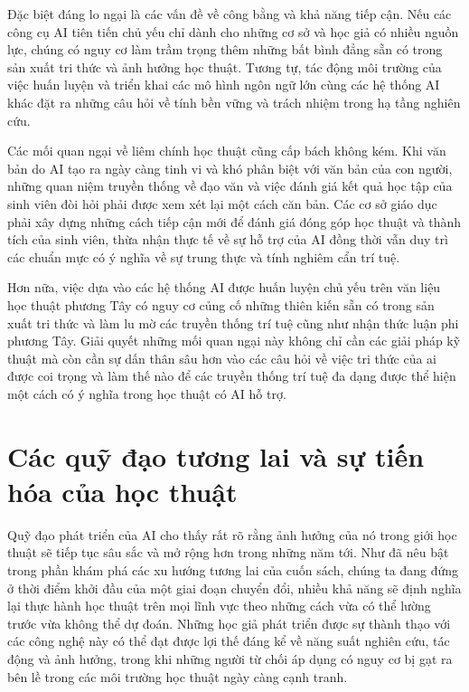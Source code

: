 Đặc biệt đáng lo ngại là các vấn đề về công bằng và khả năng tiếp cận. Nếu các công cụ AI tiên tiến chủ yếu chỉ dành cho những cơ sở và học giả có nhiều nguồn lực, chúng có nguy cơ làm trầm trọng thêm những bất bình đẳng sẵn có trong sản xuất tri thức và ảnh hưởng học thuật. Tương tự, tác động môi trường của việc huấn luyện và triển khai các mô hình ngôn ngữ lớn cùng các hệ thống AI khác đặt ra những câu hỏi về tính bền vững và trách nhiệm trong hạ tầng nghiên cứu.

Các mối quan ngại về liêm chính học thuật cũng cấp bách không kém. Khi văn bản do AI tạo ra ngày càng tinh vi và khó phân biệt với văn bản của con người, những quan niệm truyền thống về đạo văn và việc đánh giá kết quả học tập của sinh viên đòi hỏi phải được xem xét lại một cách căn bản. Các cơ sở giáo dục phải xây dựng những cách tiếp cận mới để đánh giá đóng góp học thuật và thành tích của sinh viên, thừa nhận thực tế về sự hỗ trợ của AI đồng thời vẫn duy trì các chuẩn mực có ý nghĩa về sự trung thực và tính nghiêm cẩn trí tuệ.

Hơn nữa, việc dựa vào các hệ thống AI được huấn luyện chủ yếu trên văn liệu học thuật phương Tây có nguy cơ củng cố những thiên kiến sẵn có trong sản xuất tri thức và làm lu mờ các truyền thống trí tuệ cũng như nhận thức luận phi phương Tây. Giải quyết những mối quan ngại này không chỉ cần các giải pháp kỹ thuật mà còn cần sự dấn thân sâu hơn vào các câu hỏi về việc tri thức của ai được coi trọng và làm thế nào để các truyền thống trí tuệ đa dạng được thể hiện một cách có ý nghĩa trong học thuật có AI hỗ trợ.

\section{Các quỹ đạo tương lai và sự tiến hóa của học thuật}

Quỹ đạo phát triển của AI cho thấy rất rõ rằng ảnh hưởng của nó trong giới học thuật sẽ tiếp tục sâu sắc và mở rộng hơn trong những năm tới. Như đã nêu bật trong phần khám phá các xu hướng tương lai của cuốn sách, chúng ta đang đứng ở thời điểm khởi đầu của một giai đoạn chuyển đổi, nhiều khả năng sẽ định nghĩa lại thực hành học thuật trên mọi lĩnh vực theo những cách vừa có thể lường trước vừa không thể dự đoán. Những học giả phát triển được sự thành thạo với các công nghệ này có thể đạt được lợi thế đáng kể về năng suất nghiên cứu, tác động và ảnh hưởng, trong khi những người từ chối áp dụng có nguy cơ bị gạt ra bên lề trong các môi trường học thuật ngày càng cạnh tranh.

